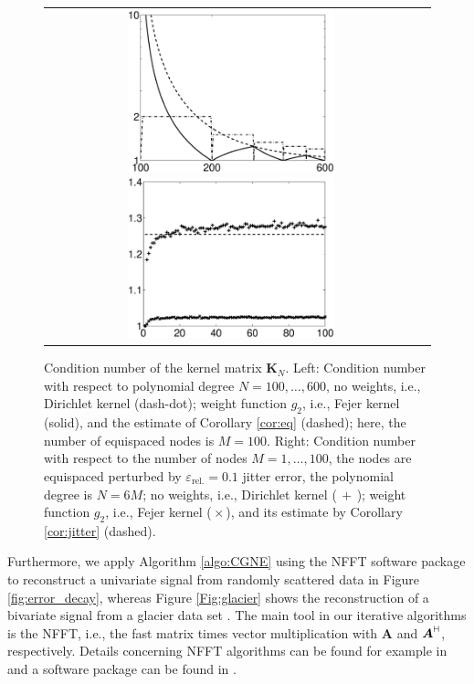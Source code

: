 \documentclass[11pt,a4paper,bibtotoc]{scrartcl}
\newcommand{\zb}[1]{\ensuremath{\boldsymbol{#1}}}
\newcommand{\adj}{{\vdash \hspace*{-1.72mm} \dashv}}
\numberwithin{equation}{section}
\numberwithin{table}{section}
\numberwithin{figure}{section}
\begin{document}
\begin{figure}[ht!]
  \begin{center}
    \begin{tabular}{cc}
      \includegraphics[width=6cm]{images/equidist_example1.eps}
      \includegraphics[width=6cm]{images/test_cond1.eps}
    \end{tabular}
  \end{center}
  \caption{Condition number of the kernel matrix $\zb K_N$.
    Left: Condition number with respect to polynomial degree
    $N=100,\hdots,600$, no weights, i.e., Dirichlet kernel (dash-dot); weight
    function $g_2$, i.e., Fejer kernel (solid), and the estimate of Corollary
    \ref{cor:eq} (dashed); here, the number of equispaced nodes is $M=100$.
    Right: Condition number with respect to the number of nodes
    $M=1,\hdots,100$, the nodes are equispaced perturbed by
    $\varepsilon_{\text{rel.}}=0.1$ jitter error, the polynomial degree is 
    $N=6M$;
    no weights, i.e., Dirichlet kernel ($\,+\,$);
    weight function $g_2$, i.e., Fejer kernel (${}\times{}$), and its estimate
    by Corollary \ref{cor:jitter} (dashed).\label{Fig:cond_eq_jitter}}
\end{figure}

Furthermore, we apply Algorithm \ref{algo:CGNE} using the NFFT software
package \cite{kupo02C} to reconstruct a univariate signal from randomly
scattered data in Figure \ref{fig:error_decay}, whereas Figure
\ref{Fig:glacier} shows the reconstruction of a bivariate signal from a
glacier data set \cite{Franke.Daten}. 
The main tool in our iterative algorithms is the NFFT, i.e., the fast matrix
times vector multiplication with $\zb A$ and $\zb A^{\adj}$, respectively.
Details concerning NFFT algorithms can be found for example in \cite{postta01}
and a software package can be found in \cite{kupo02C}.
\end{document}
